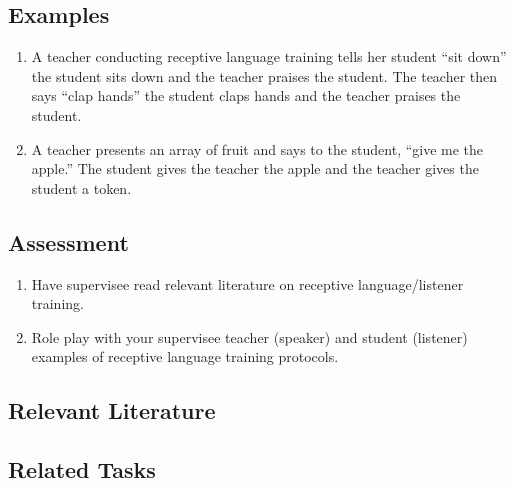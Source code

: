 \subsection{Examples}
\begin{enumerate}
\item A teacher conducting receptive language training tells her student ``sit down'' the student sits down and the teacher praises the student. The teacher then says ``clap hands'' the student claps hands and the teacher praises the student.
\item A teacher presents an array of fruit and says to the student, ``give me the apple.'' The student gives the teacher the apple and the teacher gives the student a token. 
\end{enumerate}
%
\subsection{Assessment}
\begin{enumerate}
\item Have supervisee read relevant literature on receptive language/listener training.
\item Role play with your supervisee teacher (speaker) and student (listener) examples of receptive language training protocols.
\end{enumerate}
%
\subsection{Relevant Literature}
\begin{refsection}
\nocite{cooper2007applied,
    fabrizio2001brief,
    leaf1999work,
    lovaas2003teaching,
    maurice1996behavioral,
    pelios2004teaching,
    schlinger2008listening,
    sundberg2008vb-mapp}
\printbibliography[heading=none]
\end{refsection}
%
\subsection{Related Tasks}
\fourdTen{}\\
\fourdThirteen{}\\
\fourFKFourtyThree{}\\
\fourFKFourtyFour{}\\
\fourFKFourtyFive{}\\
\fourFKFourtySix{}\\
%
%
%
%
%
%
%
%
%
%
\section{\fourdFifteen{}}
